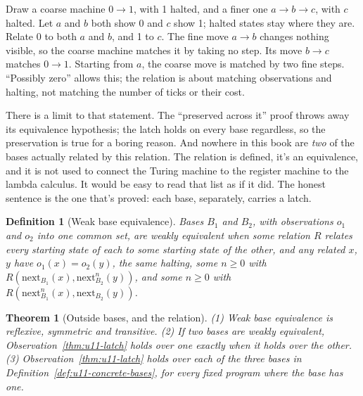 \documentclass[11pt,twoside]{article}
\theoremstyle{thielethm}
\newtheorem{theorem}{Theorem}[section]
\theoremstyle{thieledef}
\newtheorem{definition}{Definition}[section]
\theoremstyle{thieledef}
\theoremstyle{thieledef}
\theoremstyle{thielethm}
\theoremstyle{thieleobs}
\theoremstyle{thielethm}
\begin{document}
Draw a coarse machine $0\to1$, with 1 halted, and a finer one
$a\to b\to c$, with $c$ halted. Let $a$ and $b$ both show 0 and $c$ show 1;
halted states stay where they are. Relate 0 to both $a$ and $b$, and 1 to $c$.
The fine move $a\to b$ changes nothing visible, so the coarse machine matches it
by taking no step. Its move $b\to c$ matches $0\to1$. Starting from $a$, the
coarse move is matched by two fine steps. ``Possibly zero'' allows this;
the relation is about matching observations and halting, not matching the number
of ticks or their cost.

There is a limit to that statement. The ``preserved across it'' proof throws away its equivalence hypothesis; the latch holds
on every base regardless, so the preservation is true for a boring reason. And nowhere in this
book are \emph{two} of the bases actually related by this relation. The relation is
defined, it's an equivalence, and it is not used to connect the Turing machine to the
register machine to the lambda calculus. It would be
easy to read that list as if it did. The honest sentence is the one that's proved: each base, separately,
carries a latch.

\begin{definition}[Weak base equivalence]\label{def:u11-weak-equiv}
Bases $B_1$ and $B_2$, with observations $o_1$ and $o_2$ into one common set, are \emph{weakly equivalent} when some relation $R$ relates every starting state of each to some starting state
of the other, and any related $x$, $y$ have $o_1(x) = o_2(y)$, the same halting, some $n \ge 0$
with $R(\mathrm{next}_{B_1}(x), \mathrm{next}_{B_2}^n(y))$, and some $n \ge 0$ with
$R(\mathrm{next}_{B_1}^n(x), \mathrm{next}_{B_2}(y))$.
\end{definition}

\begin{theorem}[Outside bases, and the relation]\label{thm:u11-four-bases}
(1) Weak base equivalence is reflexive, symmetric and transitive. (2) If two bases are weakly
equivalent, Observation~\ref{thm:u11-latch} holds over one exactly when it holds over the other.
(3) Observation~\ref{thm:u11-latch} holds over each of the three bases in
Definition~\ref{def:u11-concrete-bases}, for every fixed program where the base has one.
\end{theorem}
\end{document}

